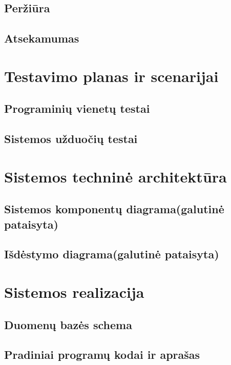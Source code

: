 \documentclass[oneside]{VUMIFPSkursinis}
\begin{document}
	\subsection{Peržiūra}
	\subsection{Atsekamumas}

\section{Testavimo planas ir scenarijai}
	\subsection{Programinių vienetų testai}
	\subsection{Sistemos užduočių testai}

\section{Sistemos techninė architektūra}
	\subsection{Sistemos komponentų diagrama(galutinė pataisyta)}
	\subsection{Išdėstymo diagrama(galutinė pataisyta)}




\section{Sistemos realizacija}
	\subsection{Duomenų bazės schema}
	\subsection{Pradiniai programų kodai ir aprašas}
\end{document}
